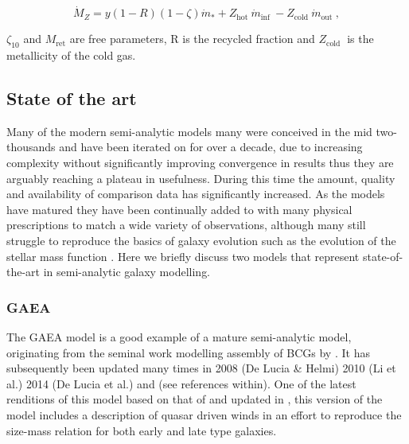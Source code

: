 \begin{equation}
\dot{M}_{Z}=y(1-R)(1-\zeta) \dot{m}_{*}+Z_{\text {hot }} \dot{m}_{\text {inf }}-Z_{\text {cold }} \dot{m}_{\text {out }},
\end{equation}

$\zeta_{10}$ and $M_{\mathrm{ret}}$ are free parameters, R is the recycled fraction and $Z_{\text {cold }}$ is the metallicity of the cold gas.


\subsection{State of the art}
Many of the modern semi-analytic models many were conceived in the mid two-thousands and have been iterated on for over a decade, due to increasing complexity without significantly improving convergence in results thus they are arguably reaching a plateau in usefulness. During this time the amount, quality and availability of comparison data has significantly increased. As the models have matured they have been continually added to with many physical prescriptions to match a wide variety of observations, although many still struggle to reproduce the basics of galaxy evolution such as the evolution of the stellar mass function \cite{Asquith2018CosmicModels}. Here we briefly discuss two models that represent state-of-the-art in semi-analytic galaxy modelling.

\subsubsection{GAEA}
The GAEA model is a good example of a mature semi-analytic model, originating from the seminal work modelling assembly of BCGs by \citet{DeLucia2007TheGalaxies}. It has subsequently been updated many times in 2008 (De Lucia \& Helmi) 2010 (Li et al.) 2014 (De Lucia et al.) and \citet{Hirschmann2016GalaxyModel} (see references within).
One of the latest renditions of this model based on that of \citep{Xie2017H2-basedFormation} and updated in \citep{Zoldan2019TheEvolution}, this version of the model includes a description of quasar driven winds in an effort to reproduce the size-mass relation for both early and late type galaxies.

